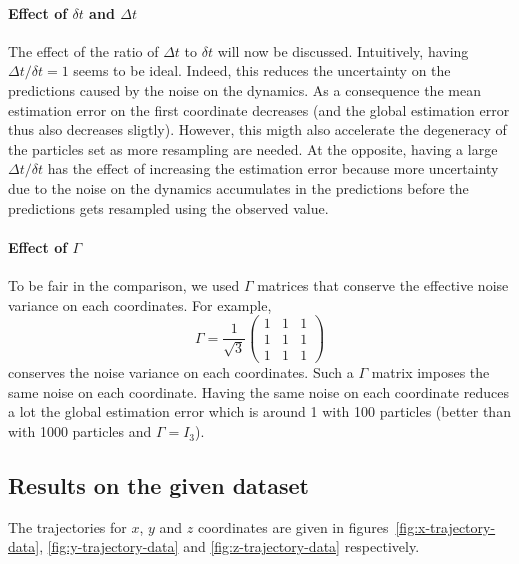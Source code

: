\documentclass[english, DIV=13]{scrartcl}
\begin{document}
\paragraph{Effect of $\delta t$ and $\Delta t$}
The effect of the ratio of $\Delta t$ to $\delta t$ will now be discussed. Intuitively,
having $\Delta t/\delta t = 1$ seems to be ideal. Indeed, this reduces the uncertainty
on the predictions caused by the noise on the dynamics. As a consequence the mean
estimation error on the first coordinate decreases (and the global estimation error
thus also decreases sligtly).
However, this migth also accelerate the degeneracy of the particles set as more
resampling are needed. At the opposite, having a large $\Delta t/\delta t$ has the
effect of increasing the estimation error because more uncertainty due to the noise on
the dynamics accumulates in the predictions before the predictions gets resampled using
the observed value.

\paragraph{Effect of $\Gamma$}
To be fair in the comparison, we used $\Gamma$ matrices that conserve the effective
noise variance on each coordinates. For example,
\begin{equation*}
    \Gamma = \frac{1}{\sqrt{3}}
    \begin{pmatrix}
        1 & 1 & 1 \\
        1 & 1 & 1 \\
        1 & 1 & 1
    \end{pmatrix}
\end{equation*}
conserves the noise variance on each coordinates. Such a $\Gamma$ matrix imposes the
same noise on each coordinate. Having the same noise on each coordinate reduces a lot
the global estimation error which is around 1 with 100 particles (better than with
1000 particles and $\Gamma = I_3$).

\subsection{Results on the given dataset}
The trajectories for $x$, $y$ and $z$ coordinates are given in
figures~\ref{fig:x-trajectory-data}, \ref{fig:y-trajectory-data} and
\ref{fig:z-trajectory-data} respectively.
\end{document}
